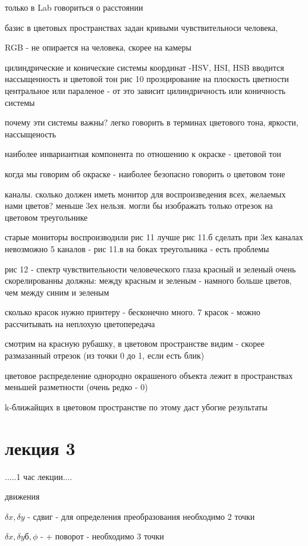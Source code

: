 \documentclass[]{report}
\begin{document}
только в Lab говориться о расстоянии

базис в цветовых пространствах задан кривыми чувствительноси человека,

RGB - не опирается на человека, скорее на камеры

цилиндрические и конические системы координат -HSV, HSI, HSB
вводится нассыщенность и цветовой тон
рис 10
проэцирование на плоскость цветности центральное или параленое - от это зависит цилиндричность или коничность системы

почему эти системы важны?
легко говорить в терминах цветового тона, яркости, нассыщеность

наиболее инвариантная компонента по отношению к окраске - цветовой тон

когда мы говорим об окраске - наиболее безопасно говорить о цветовом тоне

каналы. сколько должен иметь монитор для воспроизведения всех, желаемых нами цветов?
меньше 3ех нельзя. могли бы изображать только отрезок на цветовом треугольнике

старые мониторы воспроизводили рис 11
лучше рис 11.б сделать при 3ех каналах невозможно
5 каналов - рис 11.в
на боках треугольника - есть проблемы


рис 12 - спектр чувствительности человеческого глаза
красный и зеленый очень скорелированны
должны:
между красным и зеленым - намного больше цветов, чем между синим и зеленым

сколько красок нужно принтеру - бесконечно много. 
7 красок - можно рассчитывать на неплохую цветопередача


смотрим на красную рубашку, в цветовом пространстве видим - скорее размазанный отрезок (из точки 0 до 1, если есть блик)


цветовое распределение однородно окрашеного объекта лежит в пространствах меньшей разметности (очень редко - 0)

k-ближайщих в цветовом пространстве по этому даст убогие результаты

\chapter{лекция 3}


.....1 час лекции....

движения

$\delta x , \delta y$ - сдвиг - для определения преобразования необходимо 2 точки

$\delta x , \delta yб,\phi$ - + поворот - необходимо 3 точки
\end{document}
